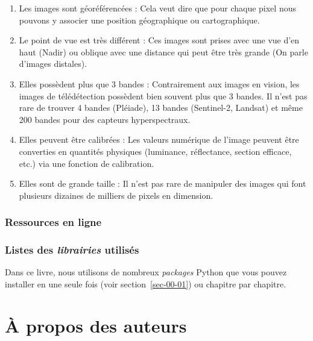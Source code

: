 \documentclass[
  11pt,
  letterpaper,
  open=any,
  twoside=false,
  french]{scrbook}
\begin{document}
\begin{enumerate}
\def\labelenumi{\arabic{enumi}.}
\item
  Les images sont géoréférencées : Cela veut dire que pour chaque pixel
  nous pouvons y associer une position géographique ou cartographique.
\item
  Le point de vue est très différent : Ces images sont prises avec une
  vue d'en haut (Nadir) ou oblique avec une distance qui peut être très
  grande (On parle d'images distales).
\item
  Elles possèdent plus que 3 bandes : Contrairement aux images en
  vision, les images de télédétection possèdent bien souvent plus que 3
  bandes. Il n'est pas rare de trouver 4 bandes (Pléiade), 13 bandes
  (Sentinel-2, Landsat) et même 200 bandes pour des capteurs
  hyperspectraux.
\item
  Elles peuvent être calibrées : Les valeurs numérique de l'image
  peuvent être converties en quantités physiques (luminance,
  réflectance, section efficace, etc.) via une fonction de calibration.
\item
  Elles sont de grande taille : Il n'est pas rare de manipuler des
  images qui font plusieurs dizaines de milliers de pixels en dimension.
\end{enumerate}

\subsection*{Ressources en ligne}\label{ressources-en-ligne}

\subsection*{\texorpdfstring{Listes des \emph{librairies}
utilisés}{Listes des librairies utilisés}}\label{sect0071}

Dans ce livre, nous utilisons de nombreux \emph{packages} Python que
vous pouvez installer en une seule fois (voir section~\ref{sec-00-01})
ou chapitre par chapitre.


\chapter*{À propos des auteurs}\label{auteurs}
\end{document}
